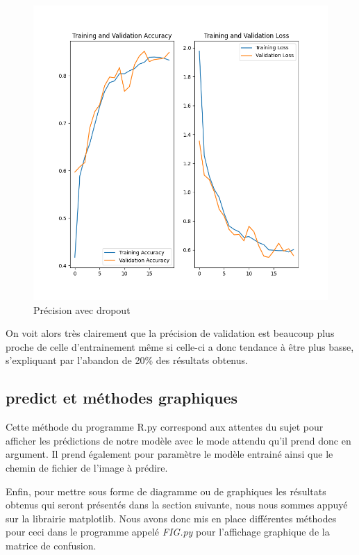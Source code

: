 \documentclass[12pt ,a4paper ]{article}
\begin{document}
\begin{multicols}{2}
\begin{figure}[H]
    \begin{center}
        \includegraphics[scale=0.4]{./img/figure_1.png}
    \end{center}
\caption{\small{Précision avec dropout}}
\end{figure}

On voit alors très clairement que la précision de validation est beaucoup plus proche de celle d'entrainement même si celle-ci a donc tendance à être plus basse, s'expliquant par l'abandon de 20\% des résultats obtenus. 

\subsection{predict et méthodes graphiques}
Cette méthode du programme R.py correspond aux attentes du sujet pour afficher les prédictions de notre modèle avec le mode attendu qu'il prend donc en argument. Il prend également pour paramètre le modèle entrainé ainsi que le chemin de fichier de l'image à prédire. 

Enfin, pour mettre sous forme de diagramme ou de graphiques les résultats obtenus qui seront présentés dans la section suivante, nous nous sommes appuyé sur la librairie matplotlib. Nous avons donc mis en place différentes méthodes pour ceci dans le programme appelé \textit{FIG.py} pour l'affichage graphique de la matrice de confusion. 


\end{multicols}
\end{document}
